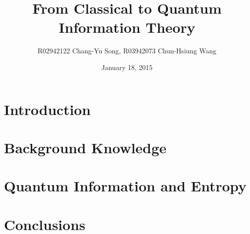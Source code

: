 \documentclass[12pt]{article}
\title{From Classical to Quantum Information Theory}
\author{R02942122 Chang-Yu Song,
        R03942073 Chun-Hsiung Wang}
\date{January 18, 2015}
\begin{document}
\maketitle

\thispagestyle{fancyplain}

\begin{abstract}

\end{abstract}

\section{Introduction}\label{sec:Intro}


\section{Background Knowledge}\label{sec:Background}


\section{Quantum Information and Entropy}\label{sec:QuantumInfo}




%
%

\section{Conclusions}\label{sec:Conclusion}






\appendix

\end{document}
